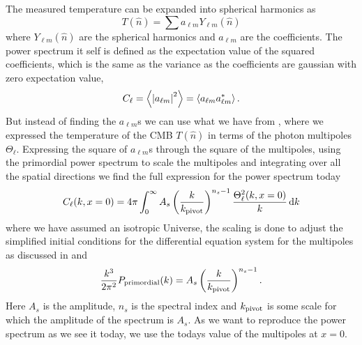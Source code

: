 \documentclass[10pt,a4paper]{article}
\begin{document}
The measured temperature can be expanded into spherical harmonics as
\begin{equation}
  T(\hat{n}) = \sum a_{\ell m} Y_{\ell m}(\hat{n})
  \label{eq: T spherical harmonics}
\end{equation}
where $Y_{\ell m}(\hat{n})$ are the spherical harmonics and $a_{\ell m}$ are the coefficients. The power spectrum it self is defined as the expectation value of the squared coefficients, which is the same as the variance as the coefficients are gaussian with zero expectation value,
\begin{equation*}
  C_\ell = \left<\abs{a_{\ell m}}^2\right> = \left<a_{\ell m}a_{\ell m}^\ast\right>.
\end{equation*}
But instead of finding the $a_{\ell m}$s we can use what we have from \cite{milestone3}, where we expressed the temperature of the CMB $T(\hat{n})$ in terms of the photon multipoles $\Theta_\ell$. Expressing the square of $a_{\ell m}$s through the square of the multipoles, using the primordial power spectrum to scale the multipoles and integrating over all the spatial directions we find the full expression for the power spectrum today
\begin{equation}
  C_\ell(k,x=0) = 4\pi \int_0^\infty A_s \left(\frac{k}{k_{\rm{pivot}}}\right)^{n_s-1}\frac{\Theta_\ell^2(k,x=0)}{k}\dd{k}
  \label{eq: C_ell} 
\end{equation}
where we have assumed an isotropic Universe, the scaling is done to adjust the simplified initial conditions for the differential equation system for the multipoles as discussed in \cite{milestone3} and
\begin{equation}
  \frac{k^3}{2\pi^2}P_{\rm{primordial}}(k) = A_s\left(\frac{k}{k_{\rm{pivot}}}\right)^{n_s-1}.
  \label{eq: Priomrodial power spectrum equation}
\end{equation}
Here $A_s$ is the amplitude, $n_s$ is the spectral index and $k_{\rm{pivot}}$ is some scale for which the amplitude of the spectrum is $A_s$. As we want to reproduce the power spectrum as we see it today, we use the todays value of the multipoles at $x=0$.
\end{document}
